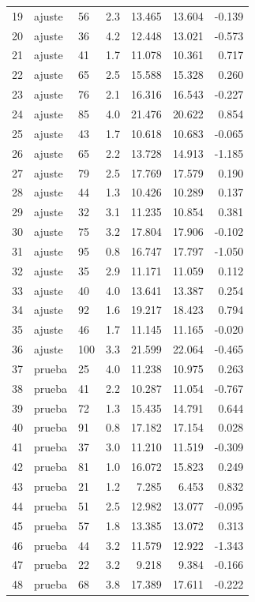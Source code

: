 \documentclass[11pt,a4paper]{article}
\begin{document}
\begin{longtable}{rllrrrr}
19 & ajuste & 56 & 2.3 & 13.465 & 13.604 & -0.139\\
20 & ajuste & 36 & 4.2 & 12.448 & 13.021 & -0.573\\
21 & ajuste & 41 & 1.7 & 11.078 & 10.361 & 0.717\\
22 & ajuste & 65 & 2.5 & 15.588 & 15.328 & 0.260\\
23 & ajuste & 76 & 2.1 & 16.316 & 16.543 & -0.227\\
24 & ajuste & 85 & 4.0 & 21.476 & 20.622 & 0.854\\
25 & ajuste & 43 & 1.7 & 10.618 & 10.683 & -0.065\\
26 & ajuste & 65 & 2.2 & 13.728 & 14.913 & -1.185\\
27 & ajuste & 79 & 2.5 & 17.769 & 17.579 & 0.190\\
28 & ajuste & 44 & 1.3 & 10.426 & 10.289 & 0.137\\
29 & ajuste & 32 & 3.1 & 11.235 & 10.854 & 0.381\\
30 & ajuste & 75 & 3.2 & 17.804 & 17.906 & -0.102\\
31 & ajuste & 95 & 0.8 & 16.747 & 17.797 & -1.050\\
32 & ajuste & 35 & 2.9 & 11.171 & 11.059 & 0.112\\
33 & ajuste & 40 & 4.0 & 13.641 & 13.387 & 0.254\\
34 & ajuste & 92 & 1.6 & 19.217 & 18.423 & 0.794\\
35 & ajuste & 46 & 1.7 & 11.145 & 11.165 & -0.020\\
36 & ajuste & 100 & 3.3 & 21.599 & 22.064 & -0.465\\
37 & prueba & 25 & 4.0 & 11.238 & 10.975 & 0.263\\
38 & prueba & 41 & 2.2 & 10.287 & 11.054 & -0.767\\
39 & prueba & 72 & 1.3 & 15.435 & 14.791 & 0.644\\
40 & prueba & 91 & 0.8 & 17.182 & 17.154 & 0.028\\
41 & prueba & 37 & 3.0 & 11.210 & 11.519 & -0.309\\
42 & prueba & 81 & 1.0 & 16.072 & 15.823 & 0.249\\
43 & prueba & 21 & 1.2 & 7.285 & 6.453 & 0.832\\
44 & prueba & 51 & 2.5 & 12.982 & 13.077 & -0.095\\
45 & prueba & 57 & 1.8 & 13.385 & 13.072 & 0.313\\
46 & prueba & 44 & 3.2 & 11.579 & 12.922 & -1.343\\
47 & prueba & 22 & 3.2 & 9.218 & 9.384 & -0.166\\
48 & prueba & 68 & 3.8 & 17.389 & 17.611 & -0.222\\
\bottomrule\end{longtable}\normalsize
\end{document}
